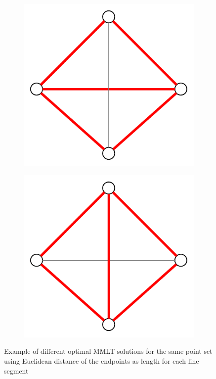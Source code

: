 \begin{figure}[ht]
  \centering
  \begin{subfigure}{0.25\textwidth}
    \centering
    \includegraphics[width=\textwidth,keepaspectratio]{img/non_unique_optimal_1.pdf}
  \end{subfigure}
  \hspace{2em}
  \VRule
  \hspace{2em}
  \centering
  \begin{subfigure}{0.25\textwidth}
    \centering
    \includegraphics[width=\textwidth,keepaspectratio]{img/non_unique_optimal_2.pdf}
  \end{subfigure}
  \caption{\label{fig:non_unique_optimal}%
    Example of different optimal \gls{MMLT} solutions %
    for the same point set using Euclidean distance of the endpoints %
    as length for each line segment}
\end{figure}

